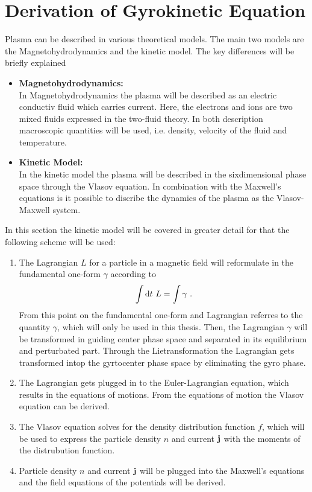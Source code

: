 
\chapter{Derivation of Gyrokinetic Equation}
\label{chap:plasmaPhysics}

\thispagestyle{empty}
\newpage

Plasma can be described in various theoretical models. The main two models are the Magnetohydrodynamics and the kinetic model. The key differences will be briefly explained
\begin{itemize}
    \item \textbf{Magnetohydrodynamics:}\\
        In Magnetohydrodynamics the plasma will be described as an electric conductiv fluid which carries current. Here, the electrons and ions are two mixed fluids expressed in the two-fluid theory. In both description macroscopic quantities will be used, i.e. density, velocity of the fluid and temperature.
    \item \textbf{Kinetic Model:}\\
        In the kinetic model the plasma will be described in the sixdimensional phase space through the Vlasov equation. In combination with the Maxwell's equations is it possible to discribe the dynamics of the plasma as the Vlasov-Maxwell system. 
\end{itemize}
\bigskip
In this section the kinetic model will be covered in greater detail for that the following scheme will be used:
\begin{enumerate}
    \item The Lagrangian $L$ for a particle in a magnetic field will reformulate in the fundamental one-form $\gamma$ according to 
        \begin{gather}
            \int \mathrm{d}t ~ L = \int \gamma~.
        \end{gather}
        From this point on the fundamental one-form and Lagrangian referres to the quantity $\gamma$, which will only be used in this thesis. Then, the Lagrangian $\gamma$ will be transformed in guiding center phase space and separated in its equilibrium and perturbated part. Through the Lietransformation the Lagrangian gets transformed intop the gyrtocenter phase space by eliminating the gyro phase. 
    \item The Lagrangian gets plugged in to the Euler-Lagrangian equation, which results in the equations of motions. From the equations of motion the Vlasov equation can be derived.
    \item The Vlasov equation solves for the density distribution function $f$, which will be used to express the particle density $n$ and current $\boldsymbol{\mathbf{j}}$ with the moments of the distrubution function. 
    \item Particle density $n$ and current $\boldsymbol{\mathbf{j}}$ will be plugged into the Maxwell's equations and the field equations of the potentials will be derived.
\end{enumerate}
